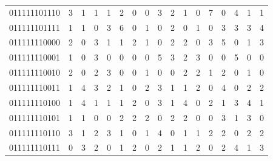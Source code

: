 \documentclass[10pt,a4paper]{article}
\begin{document}
\begin{longtable}{ |c|c|c|c|c|c|c|c|c|c|c|c|c|c|c|c|c| }
    011111101110              & 3                            & 1                                & 1                            & 1                              & 2   & 0   & 0   & 3   & 2   & 1   & 0   & 7   & 0   & 4   & 1   & 1   \\
    011111101111              & 1                            & 1                                & 0                            & 3                              & 6   & 0   & 1   & 0   & 2   & 0   & 1   & 0   & 3   & 3   & 3   & 4   \\
    011111110000              & 2                            & 0                                & 3                            & 1                              & 1   & 2   & 1   & 0   & 2   & 2   & 0   & 3   & 5   & 0   & 1   & 3   \\
    011111110001              & 1                            & 0                                & 3                            & 0                              & 0   & 0   & 0   & 5   & 3   & 2   & 3   & 0   & 0   & 5   & 0   & 0   \\
    011111110010              & 2                            & 0                                & 2                            & 3                              & 0   & 0   & 1   & 0   & 0   & 2   & 2   & 1   & 2   & 0   & 1   & 0   \\
    011111110011              & 1                            & 4                                & 3                            & 2                              & 1   & 0   & 2   & 3   & 1   & 1   & 2   & 0   & 4   & 0   & 2   & 2   \\
    011111110100              & 1                            & 4                                & 1                            & 1                              & 1   & 2   & 0   & 3   & 1   & 4   & 0   & 2   & 1   & 3   & 4   & 1   \\
    011111110101              & 1                            & 1                                & 0                            & 0                              & 2   & 2   & 2   & 0   & 2   & 2   & 0   & 0   & 3   & 1   & 3   & 0   \\
    011111110110              & 3                            & 1                                & 2                            & 3                              & 1   & 0   & 1   & 4   & 0   & 1   & 1   & 2   & 2   & 0   & 2   & 2   \\
    011111110111              & 0                            & 3                                & 2                            & 0                              & 1   & 2   & 0   & 2   & 1   & 1   & 2   & 0   & 2   & 4   & 1   & 3   \\

\end{longtable}
\end{document}
